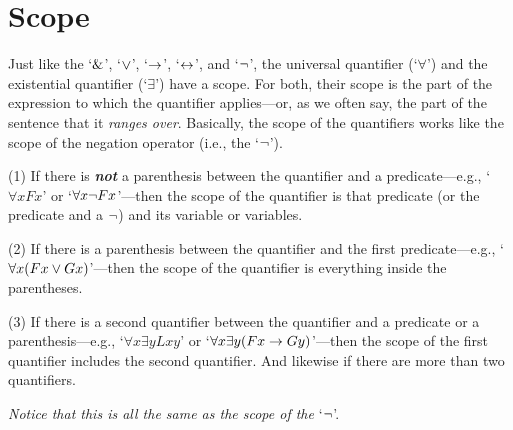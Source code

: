 \section{Scope}

Just like the `$\mathbin{\&}$', `$\vee$', `$\rightarrow$', `$\leftrightarrow$', and `${\neg}$', the universal quantifier (`$\forall$’) and the existential quantifier (`$\exists$’) have a scope. For both, their scope is the part of the expression to which the quantifier applies---or, as we often say, the part of the sentence that it \textit{ranges over}. Basically, the scope of the quantifiers works like the scope of the negation operator (i.e., the `${\neg}$’). 

\begin{ebullet}
\item[(1)] If there is \textit\textbf{not} a parenthesis between the quantifier and a predicate---e.g., `$\forall xFx$’ or `$\forall x {\neg} Fx$’---then the scope of the quantifier is that predicate (or the predicate and a ${\neg}$) and its variable or variables.\smallskip
\item[(2)] If there is a parenthesis between the quantifier and the first predicate---e.g., `$\forall x(Fx \vee Gx)$’---then the scope of the quantifier is everything inside the parentheses.\smallskip
\item[(3)] If there is a second quantifier between the quantifier and a predicate or a parenthesis---e.g., `$\forall x \exists yLxy$' or `$\forall x \exists y(Fx \rightarrow Gy)$'---then the scope of the first quantifier includes the second quantifier. And likewise if there are more than two quantifiers.\smallskip
\item[] \textit{Notice that this is all the same as the scope of the} `${\neg}$’.
\end{ebullet}
